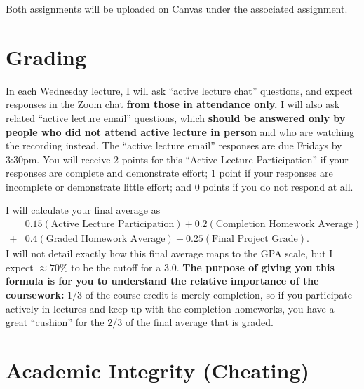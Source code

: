 \documentclass[12pt]{article}
\begin{document}
Both assignments will be uploaded on Canvas under the associated assignment.

\section*{Grading}

In each Wednesday lecture, I will ask ``active lecture chat'' questions, and expect responses in the Zoom chat \textbf{from those in attendance only.} I will also ask related ``active lecture email'' questions, which \textbf{should be answered only by people who did not attend active lecture in person} and who are watching the recording instead. The ``active lecture email'' responses are due Fridays by 3:30pm. You will receive 2 points for this ``Active Lecture Participation'' if your responses are complete and demonstrate effort; 1 point if your responses are incomplete or demonstrate little effort; and 0 points if you do not respond at all.

I will calculate your final average as 
\begin{align*}
&0.15 (\text{Active Lecture Participation}) + 0.2 (\text{Completion Homework Average}) \\ + &0.4 (\text{Graded Homework Average}) + 0.25 (\text{Final Project Grade}).
\end{align*}
I will not detail exactly how this final average maps to the GPA scale, but I expect $\approx 70\%$ to be the cutoff for a 3.0. \textbf{The purpose of giving you this formula is for you to understand the relative importance of the coursework:} $1/3$ of the course credit is merely completion, so if you participate actively in lectures and keep up with the completion homeworks, you have a great ``cushion'' for the $2/3$ of the final average that is graded.

\section*{Academic Integrity (Cheating)}
\end{document}
